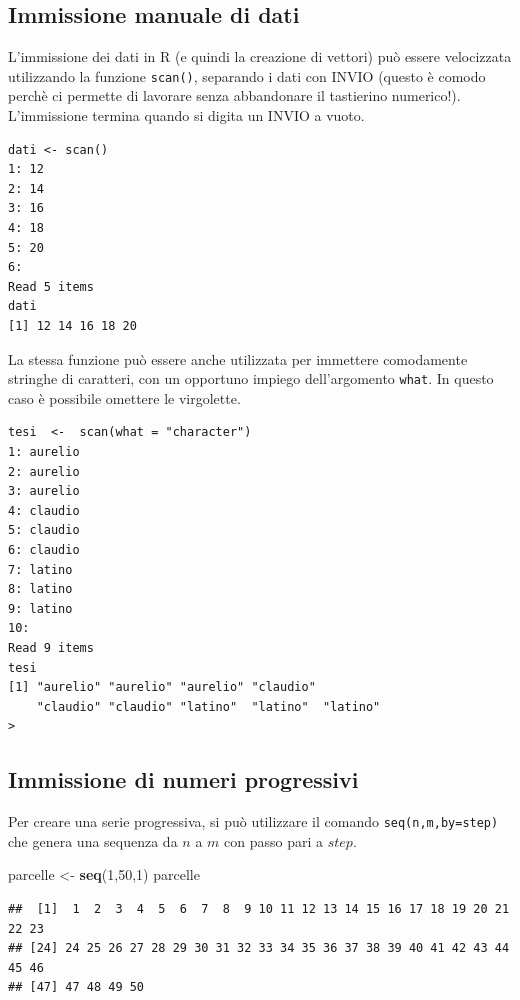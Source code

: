 \documentclass[a4paper,12pt,oneside]{book}
\newenvironment{Shaded}{\begin{snugshade}}{\end{snugshade}}
\newcommand{\KeywordTok}[1]{\textcolor[rgb]{0.13,0.29,0.53}{\textbf{#1}}}
\newcommand{\DecValTok}[1]{\textcolor[rgb]{0.00,0.00,0.81}{#1}}
\newcommand{\StringTok}[1]{\textcolor[rgb]{0.31,0.60,0.02}{#1}}
\newcommand{\NormalTok}[1]{#1}
\begin{document}
\subsection{Immissione manuale di
dati}\label{immissione-manuale-di-dati}

L'immissione dei dati in R (e quindi la creazione di vettori) può essere
velocizzata utilizzando la funzione \texttt{scan()}, separando i dati
con INVIO (questo è comodo perchè ci permette di lavorare senza
abbandonare il tastierino numerico!). L'immissione termina quando si
digita un INVIO a vuoto.

\begin{verbatim}
dati <- scan()
1: 12
2: 14
3: 16
4: 18
5: 20
6:
Read 5 items
dati
[1] 12 14 16 18 20
\end{verbatim}

La stessa funzione può essere anche utilizzata per immettere comodamente
stringhe di caratteri, con un opportuno impiego dell'argomento
\texttt{what}. In questo caso è possibile omettere le virgolette.

\begin{verbatim}
tesi  <-  scan(what = "character")
1: aurelio
2: aurelio
3: aurelio
4: claudio
5: claudio
6: claudio
7: latino
8: latino
9: latino
10: 
Read 9 items
tesi
[1] "aurelio" "aurelio" "aurelio" "claudio" 
    "claudio" "claudio" "latino"  "latino"  "latino" 
>
\end{verbatim}

\subsection{Immissione di numeri
progressivi}\label{immissione-di-numeri-progressivi}

Per creare una serie progressiva, si può utilizzare il comando
\texttt{seq(n,m,by=step)} che genera una sequenza da \(n\) a \(m\) con
passo pari a \(step\).

\begin{Shaded}
\begin{Highlighting}[]
\NormalTok{parcelle  <-}\StringTok{  }\KeywordTok{seq}\NormalTok{(}\DecValTok{1}\NormalTok{,}\DecValTok{50}\NormalTok{,}\DecValTok{1}\NormalTok{)}
\NormalTok{parcelle}
\end{Highlighting}
\end{Shaded}

\begin{verbatim}
##  [1]  1  2  3  4  5  6  7  8  9 10 11 12 13 14 15 16 17 18 19 20 21 22 23
## [24] 24 25 26 27 28 29 30 31 32 33 34 35 36 37 38 39 40 41 42 43 44 45 46
## [47] 47 48 49 50
\end{verbatim}
\end{document}
